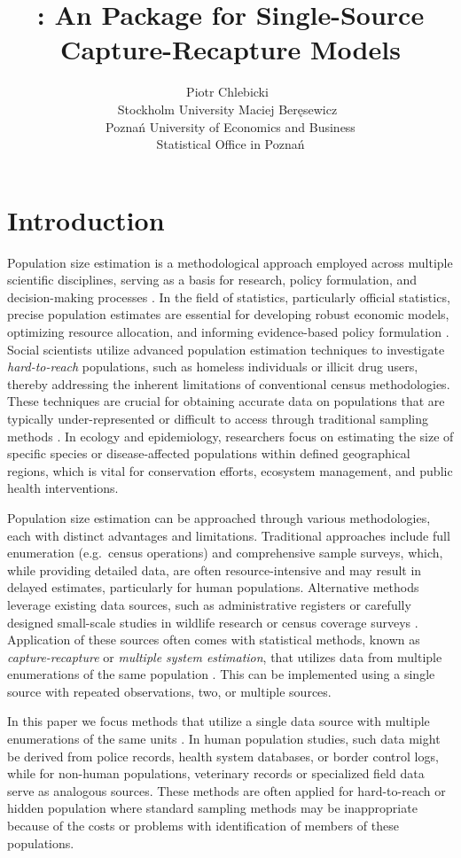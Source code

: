 \documentclass[
]{jss}
\author{
Piotr Chlebicki~\orcidlink{0009-0006-4867-7434}\\Stockholm
University \And Maciej
Beręsewicz~\orcidlink{0000-0002-8281-4301}\\Poznań University of
Economics and Business\\
Statistical Office in Poznań
}
\title{\pkg{singleRcapture}: An \proglang{R} Package for Single-Source
Capture-Recapture Models}
\newcommand{\1}{\mathcal{I}} \newcommand{\bZero}{\boldsymbol{0}}
\begin{document}
\section{Introduction}\label{sec-introduction}

Population size estimation is a methodological approach employed across
multiple scientific disciplines, serving as a basis for research, policy
formulation, and decision-making processes \citep{bohning2018capture}.
In the field of statistics, particularly official statistics, precise
population estimates are essential for developing robust economic
models, optimizing resource allocation, and informing evidence-based
policy formulation \citep[cf.][]{baffour-awuah2009}. Social scientists
utilize advanced population estimation techniques to investigate
\emph{hard-to-reach} populations, such as homeless individuals or
illicit drug users, thereby addressing the inherent limitations of
conventional census methodologies. These techniques are crucial for
obtaining accurate data on populations that are typically
under-represented or difficult to access through traditional sampling
methods \citep{vincent2022estimating}. In ecology and epidemiology,
researchers focus on estimating the size of specific species or
disease-affected populations within defined geographical regions, which
is vital for conservation efforts, ecosystem management, and public
health interventions.

Population size estimation can be approached through various
methodologies, each with distinct advantages and limitations.
Traditional approaches include full enumeration (e.g.~census operations)
and comprehensive sample surveys, which, while providing detailed data,
are often resource-intensive and may result in delayed estimates,
particularly for human populations. Alternative methods leverage
existing data sources, such as administrative registers or carefully
designed small-scale studies in wildlife research or census coverage
surveys \citep{wolter1986some, zhang2019note}. Application of these
sources often comes with statistical methods, known as
\emph{capture-recapture} or \emph{multiple system estimation}, that
utilizes data from multiple enumerations of the same population
\citep[cf.][]{dunne2024system}. This can be implemented using a single
source with repeated observations, two, or multiple sources.

In this paper we focus methods that utilize a single data source with
multiple enumerations of the same units \citep[cf.][]{ztpoisson}. In
human population studies, such data might be derived from police
records, health system databases, or border control logs, while for
non-human populations, veterinary records or specialized field data
serve as analogous sources. These methods are often applied for
hard-to-reach or hidden population where standard sampling methods may
be inappropriate because of the costs or problems with identification of
members of these populations.
\end{document}

